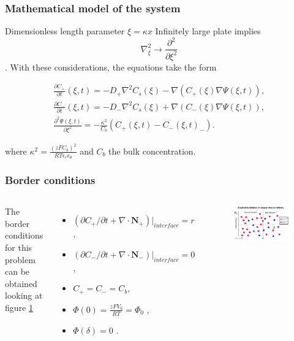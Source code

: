 \documentclass{beamer}
\newcommand{\qty}[1]
{
	\left({#1}\right)
}
\begin{document}
\begin{frame}
\frametitle{Mathematical model of the system}
Dimensionless length parameter $\xi = \kappa x$ 
Infinitely large plate implies $$\nabla_\xi^2 \rightarrow \frac{\partial^2}{\partial \xi^2}$$.  
With these considerations, the equations take the form

\begin{align}
\frac{\partial C_+}{\partial t}(\xi,t)  = - D_+ \nabla^2 C_s(\xi) - \nabla(C_+(\xi) \nabla \Psi(\xi,t)),\\
\frac{\partial C_-}{\partial t}(\xi,t) = - D_- \nabla^2 C_s(\xi) + \nabla(C_-(\xi) \nabla \Psi(\xi,t)),\\
\frac{\partial^2 \Psi(\xi,t)}{\partial \xi^2} = -\frac{\kappa^2}{C_b} \left(C_+(\xi,t) - C_-(\xi,t)_-\right).
\end{align}

where $\kappa^2 = \frac{(zFC_b)^2}{RT\epsilon_r \epsilon_0} $ and $C_b$ the bulk concentration.


\end{frame}

\begin{frame}
\frametitle{Border conditions}
\begin{columns}
	The border conditions for this problem can be obtained looking at figure \ref{fig:geometry2}
		\begin{itemize}
		\item $\qty{\partial C_+/\partial t + \nabla \cdot \mathbf{N_+}}\big|_{interface} = r$, 
		\item $\qty{\partial C_-/\partial t +  \nabla \cdot \mathbf{N_-}} \big|_{interface} = 0$, 
		\item $C_+ = C_- = C_b$,
		\item $\Phi(0) = \frac{zFV_0}{RT} = \Phi_0$ ,
		\item $\Phi(\delta) = 0$ .
	\end{itemize}		

	\begin{figure}
	\includegraphics[width=\textwidth]{geometry.png}
	\caption{}
	\label{fig:geometry2}
	\end{figure}
	
\end{columns}
\end{frame}
\end{document}
